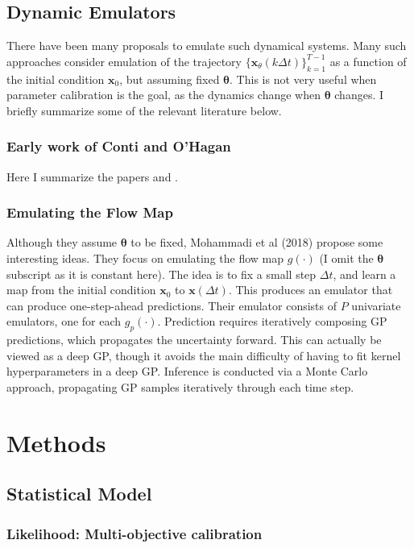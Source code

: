 \documentclass[12pt]{article}
\newcommand{\btheta}{\boldsymbol{\theta}}
\newcommand{\bx}{\mathbf{x}}
\begin{document}
 \subsection{Dynamic Emulators}
 There have been many proposals to emulate such dynamical systems. Many such approaches consider emulation of the trajectory $\{\bx_\theta(k\Delta t)\}_{k = 1}^{T-1}$ as a function of 
 the initial condition $\bx_0$, but assuming fixed $\btheta$. This is not very useful when parameter calibration is the goal, as the dynamics change when $\btheta$ changes. I briefly summarize some 
 of the relevant literature below. 
 
 \subsubsection{Early work of Conti and O'Hagan}
 Here I summarize the papers \cite{10.1093/biomet/asp028} and \cite{CONTI2010640}. 
 
\subsubsection{Emulating the Flow Map}
Although they assume $\btheta$ to be fixed, Mohammadi et al (2018) \cite{MOHAMMADI2019178} propose some interesting ideas. They focus on emulating the flow map $g(\cdot)$ 
(I omit the $\btheta$ subscript as it is constant here). The idea is to fix a small step $\Delta t$, and learn a map from the initial condition $\bx_0$ to $\bx(\Delta t)$. This produces an emulator 
that can produce one-step-ahead predictions. Their emulator consists of $P$ univariate emulators, one for each $g_p(\cdot)$. Prediction requires iteratively composing GP predictions, which 
propagates the uncertainty forward. This can actually be viewed as a deep GP, though it avoids the main difficulty of having to fit kernel hyperparameters in a deep GP. Inference is conducted 
via a Monte Carlo approach, propagating GP samples iteratively through each time step. 

\section{Methods}

\subsection{Statistical Model}
\subsubsection{Likelihood: Multi-objective calibration}
\end{document}
